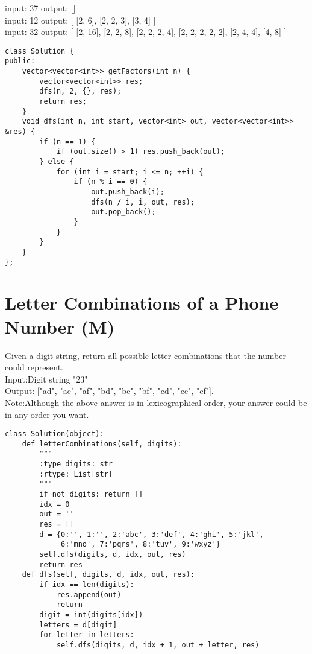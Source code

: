 input: 37
output: 
[]\\

input: 12
output:
[
  [2, 6],
  [2, 2, 3],
  [3, 4]
]\\

input: 32
output:
[
  [2, 16],
  [2, 2, 8],
  [2, 2, 2, 4],
  [2, 2, 2, 2, 2],
  [2, 4, 4],
  [4, 8]
]\\

\begin{lstlisting}
class Solution {
public:
    vector<vector<int>> getFactors(int n) {
        vector<vector<int>> res;
        dfs(n, 2, {}, res);
        return res;
    }
    void dfs(int n, int start, vector<int> out, vector<vector<int>> &res) {
        if (n == 1) {
            if (out.size() > 1) res.push_back(out);
        } else {
            for (int i = start; i <= n; ++i) {
                if (n % i == 0) {
                    out.push_back(i);
                    dfs(n / i, i, out, res);
                    out.pop_back();
                }
            }
        }
    }
};
\end{lstlisting}


\section{Letter Combinations of a Phone Number (M)}
Given a digit string, return all possible letter combinations that the number could represent.\\

Input:Digit string "23"\\
Output: ["ad", "ae", "af", "bd", "be", "bf", "cd", "ce", "cf"].\\

Note:Although the above answer is in lexicographical order, your answer could be in any order you want. \\

\begin{lstlisting}
class Solution(object):            
    def letterCombinations(self, digits):
        """
        :type digits: str
        :rtype: List[str]
        """
        if not digits: return []
        idx = 0
        out = ''
        res = []
        d = {0:'', 1:'', 2:'abc', 3:'def', 4:'ghi', 5:'jkl',
             6:'mno', 7:'pqrs', 8:'tuv', 9:'wxyz'}
        self.dfs(digits, d, idx, out, res)
        return res
    def dfs(self, digits, d, idx, out, res):
        if idx == len(digits):
            res.append(out)
            return
        digit = int(digits[idx])
        letters = d[digit]
        for letter in letters:
            self.dfs(digits, d, idx + 1, out + letter, res)
\end{lstlisting}

